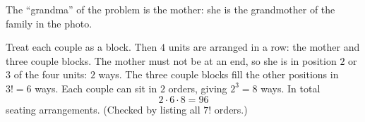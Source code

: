 The ``grandma'' of the problem is the mother: she is the grandmother of the family in the photo.

Treat each couple as a block. Then $4$ units are arranged in a row: the mother and three couple blocks. The mother must not be at an end, so she is in position $2$ or $3$ of the four units: $2$ ways. The three couple blocks fill the other positions in $3!=6$ ways. Each couple can sit in $2$ orders, giving $2^3=8$ ways. In total
\[
2\cdot6\cdot8=\boxed{96}
\]
seating arrangements. (Checked by listing all $7!$ orders.)
